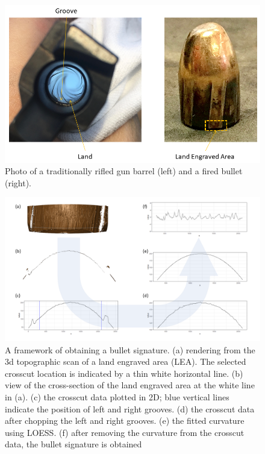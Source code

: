\begin{Schunk}
\begin{figure}

{\centering \includegraphics[width=.8\textwidth]{ju-hofmann_files/figure-latex/barrel_bullet_ps} 

}

\caption[Photo of a traditionally rifled gun barrel (left) and a fired bullet (right)]{Photo of a traditionally rifled gun barrel (left) and a fired bullet (right).}\label{fig:bullet}
\end{figure}
\end{Schunk}

\begin{Schunk}
\begin{figure}

{\centering \includegraphics[width=.9\textwidth]{ju-hofmann_files/figure-latex/figure1_v2} 

}

\caption[A framework of obtaining a bullet signature]{A framework of obtaining a bullet signature. (a) rendering from the 3d topographic scan of a land engraved area (LEA). The selected crosscut location is indicated by a thin white horizontal line. (b) view of the cross-section of the land engraved area at the white line in (a). (c) the crosscut data plotted in 2D; blue vertical lines indicate the position of left and right grooves. (d) the crosscut data after chopping the left and right grooves. (e) the fitted curvature using LOESS. (f) after removing the curvature from the crosscut data, the bullet signature is obtained}\label{fig:process}
\end{figure}
\end{Schunk}

